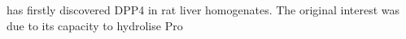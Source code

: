 \citet{Hopsu-Havu1966} has firstly discovered DPP4 in rat liver homogenates. The original interest was due to its capacity to hydrolise Pro